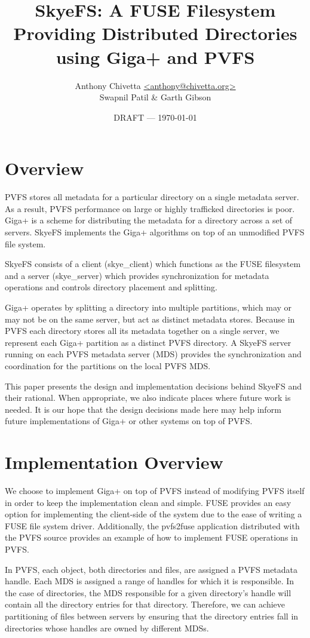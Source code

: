 \documentclass[letterpaper]{article}
\title{SkyeFS: A FUSE Filesystem Providing Distributed Directories using Giga+
and PVFS}
\author{Anthony Chivetta \url{<anthony@chivetta.org>}\\Swapnil Patil \& Garth
Gibson}
\date{DRAFT --- \today}
\begin{document}
\maketitle

\section{Overview}
PVFS stores all metadata for a particular directory on a single metadata server.
As a result, PVFS performance on large or highly trafficked directories is
poor. Giga+ is a scheme for distributing the metadata for a directory across a
set of servers.  SkyeFS implements the Giga+ algorithms on top of an unmodified
PVFS file system.

SkyeFS consists of a client (skye\_\-client) which functions as the FUSE filesystem
and a server (skye\_\-server) which provides synchronization for metadata
operations and controls directory placement and splitting.  

Giga+ operates by splitting a directory into multiple partitions, which may or
may not be on the same server, but act as distinct metadata stores.  Because in
PVFS each directory stores all its metadata together on a single server, we
represent each Giga+ partition as a distinct PVFS directory.  A SkyeFS server
running on each PVFS metadata server (MDS) provides the synchronization and
coordination for the partitions on the local PVFS MDS.  

This paper presents the design and implementation decisions behind SkyeFS and
their rational.  When appropriate, we also indicate places where future work is
needed.  It is our hope that the design decisions made here may help inform
future implementations of Giga+ or other systems on top of PVFS.

\section{Implementation Overview}
We choose to implement Giga+ on top of PVFS instead of modifying PVFS itself in
order to keep the implementation clean and simple.  FUSE provides an easy option
for implementing the client-side of the system due to the ease of writing a FUSE
file system driver.  Additionally, the pvfs2\-fuse application distributed with
the PVFS source provides an example of how to implement FUSE operations in PVFS.

In PVFS, each object, both directories and files, are assigned a PVFS metadata
handle.  Each MDS is assigned a range of handles for which it is
responsible.  In the case of directories, the MDS responsible for a given
directory's handle will contain all the directory entries for that directory.
Therefore, we can achieve partitioning of files between servers by ensuring that
the directory entries fall in directories whose handles are owned by different
MDSs.  
\end{document}

